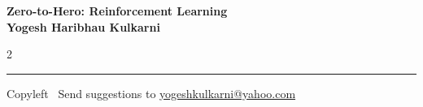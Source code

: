 \documentclass[8pt,landscape]{article}
\begin{document}
\footnotesize


\begin{center}
\Large{\textbf{Zero-to-Hero: Reinforcement Learning\\ Yogesh Haribhau Kulkarni}}  
\end{center}

\begin{multicols}{2}

\end{multicols}

\rule{\linewidth}{0.25pt}
\scriptsize
Copyleft \textcopyleft\  Send suggestions to 
\href{http://www.yogeshkulkarni.com}{yogeshkulkarni@yahoo.com}
\end{document}
